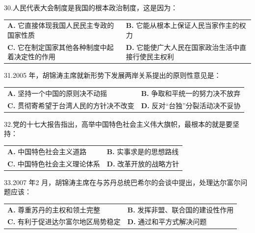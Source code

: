 \documentclass[UTF8,11pt]{ctexart}
\begin{document}
30.人民代表大会制度是我国的根本政治制度，这是因为：


\begin{center}\begin{tabular}{>{\raggedright\arraybackslash}p{\dimexpr(\linewidth-4\tabcolsep)/2\relax}>{\raggedright\arraybackslash}p{\dimexpr(\linewidth-4\tabcolsep)/2\relax}}
\textbf{A.} 它直接体现我国人民民主专政的国家性质 & \textbf{B.} 它能从根本上保证人民当家作主的权力\\[.35em]
\textbf{C.} 它在制定国家其他各种制度中起着决定性的作用 & \textbf{D.} 它能使广大人民在国家政治生活中直接行使民主权利\\[.35em]\end{tabular}\end{center}

31.2005 年，胡锦涛主席就新形势下发展两岸关系提出的原则性意见是：


\begin{center}\begin{tabular}{>{\raggedright\arraybackslash}p{\dimexpr(\linewidth-4\tabcolsep)/2\relax}>{\raggedright\arraybackslash}p{\dimexpr(\linewidth-4\tabcolsep)/2\relax}}
\textbf{A.} 坚持一个中国的原则决不动摇 & \textbf{B.} 争取和平统一的努力决不放弃\\[.35em]
\textbf{C.} 贯彻寄希望于台湾人民的方针决不改变 & \textbf{D.} 反对“台独”分裂活动决不妥协\\[.35em]\end{tabular}\end{center}

32.党的十七大报告指出，高举中国特色社会主义伟大旗帜，最根本的就是要坚持：


\begin{center}\begin{tabular}{>{\raggedright\arraybackslash}p{\dimexpr(\linewidth-4\tabcolsep)/2\relax}>{\raggedright\arraybackslash}p{\dimexpr(\linewidth-4\tabcolsep)/2\relax}}
\textbf{A.} 中国特色社会主义道路 & \textbf{B.} 实事求是的思想路线\\[.35em]
\textbf{C.} 中国特色社会主义理论体系 & \textbf{D.} 改革开放的战略方针\\[.35em]\end{tabular}\end{center}

33.2007 年2 月，胡锦涛主席在与苏丹总统巴希尔的会谈中提出，处理达尔富尔问题应该：


\begin{center}\begin{tabular}{>{\raggedright\arraybackslash}p{\dimexpr(\linewidth-4\tabcolsep)/2\relax}>{\raggedright\arraybackslash}p{\dimexpr(\linewidth-4\tabcolsep)/2\relax}}
\textbf{A.} 尊重苏丹的主权和领土完整 & \textbf{B.} 发挥非盟、联合国的建设性作用\\[.35em]
\textbf{C.} 有利于促进达尔富尔地区局势稳定 & \textbf{D.} 通过和平方式解决问题\\[.35em]\end{tabular}\end{center}
\end{document}

